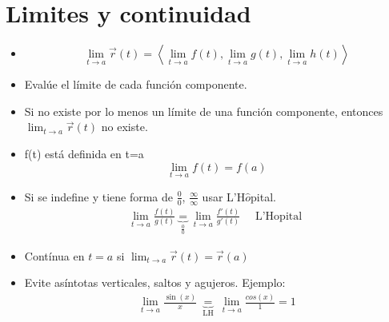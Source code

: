 \section{Limites y continuidad}
\begin{itemize}
    \item \[
        \lim_{t \to a}\vec{r}(t) = \left\langle \lim_{t \to a} f(t),\lim_{t \to a} g(t),\lim_{t \to a} h(t) \right\rangle 
      \]
    
    \item Evalúe el límite de cada función componente.
    \item Si no existe por lo menos un límite de una función componente, entonces $\lim_{t \to a} \vec{r}(t) $ no existe.
    \item f(t) está definida en t=a
    \[
      \lim_{t \to a} f(t) = f(a)
    \]
    
    \item Si se indefine y tiene forma de $\frac{0}{0} $, $\frac{\infty}{\infty} $ usar L'H$\hat{o}$pital.
        \begin{align*}
            \lim_{t \to a} \frac{f(t)}{g(t)} \underbrace{=}_{\frac{0}{0} } \lim_{t \to a} \frac{f'(t)}{g'(t)} \quad \text{  L'Hopital  }
        \end{align*}
    
    \item Contínua en $t=a$ si $\lim_{t \to a} \vec{r}(t)=\vec{r}(a)$
    \item Evite asíntotas verticales, saltos y agujeros. Ejemplo: 
        \begin{align*} 
            \lim_{t \to a} \frac{\sin(x)}{x} \underbrace{=}_{\text{  LH  }} \lim_{t \to a} \frac{cos(x)}{1} = 1 \\ 
        \end{align*}
    
\end{itemize}


